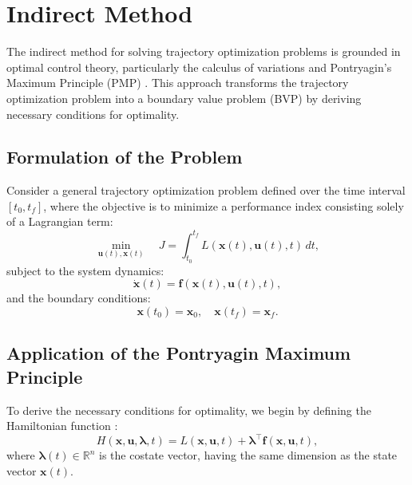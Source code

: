 \section{Indirect Method}

The indirect method for solving trajectory optimization problems is grounded in optimal control theory, particularly the calculus of variations and Pontryagin’s Maximum Principle (PMP) \cite{sanchez2018real}. This approach transforms the trajectory optimization problem into a boundary value problem (BVP) by deriving necessary conditions for optimality.


\subsection{Formulation of the Problem}

Consider a general trajectory optimization problem defined over the time interval \([t_0, t_f]\), where the objective is to minimize a performance index consisting solely of a Lagrangian term:
\begin{equation} \label{eq:cost_function}
\min_{\mathbf{u}(t), \mathbf{x}(t)} \quad J = \int_{t_0}^{t_f} L(\mathbf{x}(t), \mathbf{u}(t), t) \, dt,
\end{equation}
subject to the system dynamics:
\begin{equation} \label{eq:dynamics}
\dot{\mathbf{x}}(t) = \mathbf{f}(\mathbf{x}(t), \mathbf{u}(t), t),
\end{equation}
and the boundary conditions:
\begin{equation} \label{eq:boundary_conditions}
\mathbf{x}(t_0) = \mathbf{x}_0, \quad \mathbf{x}(t_f) = \mathbf{x}_f.
\end{equation}

\subsection{Application of the Pontryagin Maximum Principle}

To derive the necessary conditions for optimality, we begin by defining the Hamiltonian function \cite{pinch1995optimal}:
\begin{equation} \label{eq:hamiltonian}
H(\mathbf{x}, \mathbf{u}, \boldsymbol{\lambda}, t) = L(\mathbf{x}, \mathbf{u}, t) + \boldsymbol{\lambda}^\top \mathbf{f}(\mathbf{x}, \mathbf{u}, t),
\end{equation}
where \( \boldsymbol{\lambda}(t) \in \mathbb{R}^n \) is the costate vector, having the same dimension as the state vector \( \mathbf{x}(t) \).

